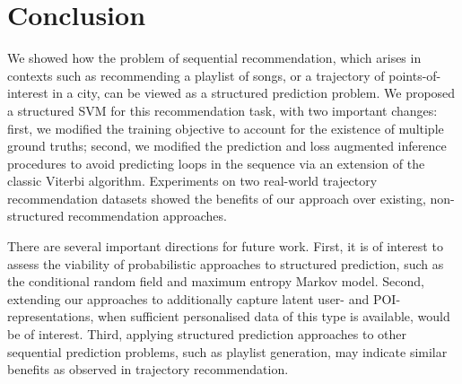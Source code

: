 
\secmoveup
\section{Conclusion}
\textmoveup

We showed how the problem of sequential recommendation,
which arises in contexts such as
recommending a playlist of songs, or a trajectory of points-of-interest in a city,
can be viewed as a structured prediction problem.
We proposed a structured SVM for this recommendation task, with two important changes:
first, we modified the training objective to account for the existence of multiple ground truths;
second, we modified the prediction and loss augmented inference procedures to avoid predicting loops in the sequence via an extension of the classic Viterbi algorithm.
Experiments on two real-world trajectory recommendation datasets showed the benefits of our approach over existing, non-structured recommendation approaches.

There are several important directions for future work.
First, it is of interest to assess the viability of probabilistic approaches to structured prediction,
such as the conditional random field and maximum entropy Markov model.
Second, extending our approaches to additionally capture latent user- and POI-representations, when sufficient personalised data of this type is available, would be of interest.
Third, applying structured prediction approaches to other sequential prediction problems, such as playlist generation, may indicate similar benefits as observed in trajectory recommendation.
